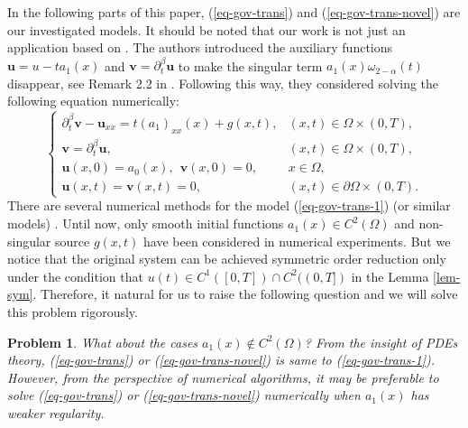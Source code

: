 \documentclass[11pt]{article}
\newtheorem{problem}{Problem}
\numberwithin{equation}{section}
\begin{document}
In the following parts of this paper, (\ref{eq-gov-trans}) and (\ref{eq-gov-trans-novel}) are our investigated models. It should be noted that our work is not just an application based on \cite{LyuP2022SFOR}. The authors introduced the auxiliary functions $\textbf{u}=u-ta_1(x)$ and $\textbf{v}  = \partial_t^\beta\textbf{u}$ to make the singular term $a_1(x)\omega_{2-\alpha}(t)$ disappear, see Remark 2.2 in \cite{LyuP2022SFOR}. Following this way, they considered solving the following equation numerically:
\begin{equation}\label{eq-gov-trans-1}
\begin{cases}
  \partial_t^\beta\textbf{v} - \textbf{u}_{xx} = t(a_1)_{xx}(x)+g(x,t), & (x,t) \in \Omega \times (0,T), \\
  \textbf{v}  = \partial_t^\beta \textbf{u}, & (x,t) \in \Omega \times (0,T), \\
  \textbf{u}(x,0) =a_0(x),~~ \textbf{v}(x,0)=0, & x \in \Omega, \\
  \textbf{u}(x,t) = \textbf{v}(x,t)=0, & (x,t) \in \partial \Omega \times (0,T).
\end{cases}
\end{equation}
There are several numerical methods for the model (\ref{eq-gov-trans-1}) (or similar models) \cite{LyuP2021SFOR,An2022,Kundaliya,cendcds,chenlisha,duruilian,liuyang2025}. Until now, only smooth initial functions $a_1(x)\in C^2(\Omega)$ and non-singular source $g(x,t)$ have been considered in numerical experiments. But we notice that the original system can be achieved symmetric order reduction only under the condition that $u(t)\in C^1([0,T])\cap C^2((0,T])$ in the Lemma \ref{lem-sym}. Therefore, it natural for us to raise the following question and we will solve this problem rigorously. 
\begin{problem}
What about the cases $a_1(x)\notin C^2(\Omega)$? From the insight of PDEs theory, (\ref{eq-gov-trans}) or (\ref{eq-gov-trans-novel}) is same to (\ref{eq-gov-trans-1}). However, from the perspective of numerical algorithms, it may be preferable to solve (\ref{eq-gov-trans}) or (\ref{eq-gov-trans-novel}) numerically when $a_1(x)$ has weaker regularity. 
\end{problem}
\end{document}
